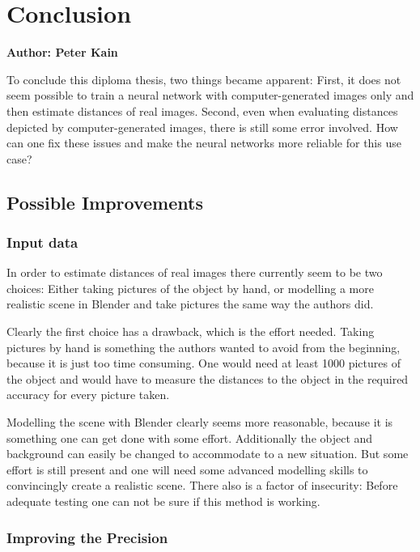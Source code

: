 \chapter{Conclusion}

\textbf{Author: Peter Kain} 

To conclude this diploma thesis, two things became apparent: First, it does not seem possible to train a neural network with computer-generated images only and then estimate distances of real images. Second, even when evaluating distances depicted by computer-generated images, there is still some error involved. How can one fix these issues and make the neural networks more reliable for this use case?

\section{Possible Improvements}

\subsection{Input data}

In order to estimate distances of real images there currently seem to be two choices: Either taking pictures of the object by hand, or modelling a more realistic scene in Blender and take pictures the same way the authors did.

Clearly the first choice has a drawback, which is the effort needed. Taking pictures by hand is something the authors wanted to avoid from the beginning, because it is just too time consuming. One would need at least 1000 pictures of the object and would have to measure the distances to the object in the required accuracy for every picture taken.

Modelling the scene with Blender clearly seems more reasonable, because it is something one can get done with some effort. Additionally the object and background can easily be changed to accommodate to a new situation. But some effort is still present and one will need some advanced modelling skills to convincingly create a realistic scene. There also is a factor of insecurity: Before adequate testing one can not be sure if this method is working.

\subsection{Improving the Precision}

